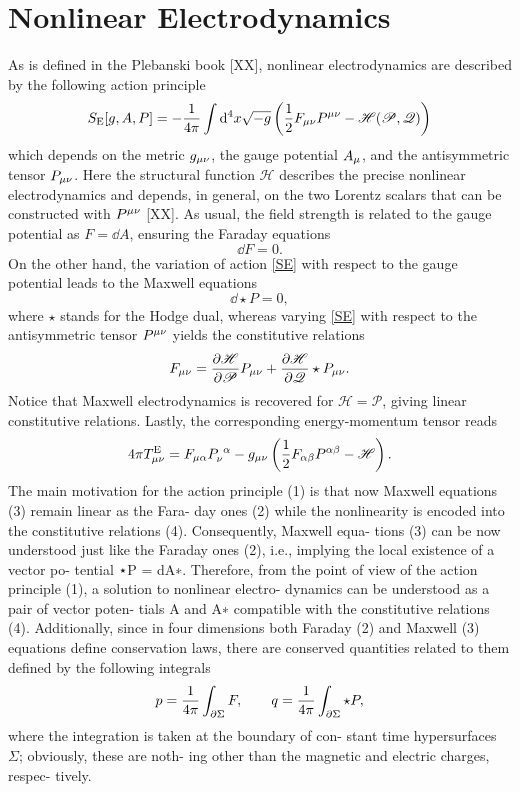 \section{Nonlinear Electrodynamics}
As is defined in the Plebanski book [XX], nonlinear electrodynamics are described by the following action principle
\begin{equation}\label{SE}
  S_{\rm E}[g,A,P]=-\frac{1}{4\pi }\int\dd^4 x\sqrt{-g}\left(\frac{1}{2}F_{\mu\nu }P^{\mu\nu }-\mathscr{H}(\mathscr{P},\mathscr{Q})\right)
\end{equation}
which depends on the metric $g_{\mu\nu }$, the gauge potential $A_\mu$, and the antisymmetric tensor $P_{\mu\nu }$. Here the structural function $\mathscr{H}$ describes the precise nonlinear electrodynamics and depends, in general, on the two Lorentz scalars that can be constructed with $P^{\mu\nu }$ [XX]. As usual, the field strength is related to the gauge potential as $F=\dd A$, ensuring the Faraday equations
\begin{equation}
  \dd F=0.
\end{equation}
On the other hand, the variation of action \eqref{SE} with respect to the gauge potential leads to the Maxwell equations
\begin{equation}
	\dd \star P=0,
\end{equation}
where $\star$ stands for the Hodge dual, whereas varying \eqref{SE} with respect to the antisymmetric tensor $P^{\mu\nu }$ yields the constitutive relations
\begin{equation}
  F_{\mu\nu }=\pdv{\mathscr{H}}{\mathscr{P}}P_{\mu\nu }+\pdv{\mathscr{H}}{\mathscr{Q}}\star P_{\mu\nu }.
\end{equation}
Notice that Maxwell electrodynamics is recovered for $\mathscr{H}=\mathscr{P}$, giving linear constitutive relations. Lastly, the corresponding energy-momentum tensor reads
\begin{equation}
  4\pi T_{\mu\nu }^{\rm E}=F_{\mu\alpha }P_{\nu }^{~\alpha }-g_{\mu\nu }\left(\frac{1}{2}F_{\alpha\beta }P^{\alpha\beta }-\mathscr{H}\right). 
\end{equation}
The main motivation for the action principle (1) is that now Maxwell equations (3) remain linear as the Fara- day ones (2) while the nonlinearity is encoded into the constitutive relations (4). Consequently, Maxwell equa- tions (3) can be now understood just like the Faraday ones (2), i.e., implying the local existence of a vector po- tential ⋆P = dA∗. Therefore, from the point of view of the action principle (1), a solution to nonlinear electro- dynamics can be understood as a pair of vector poten- tials A and A∗ compatible with the constitutive relations (4). Additionally, since in four dimensions both Faraday (2) and Maxwell (3) equations define conservation laws, there are conserved quantities related to them defined by the following integrals
\begin{equation}
  p=\frac{1}{4\pi }\int_{\partial\Sigma}F,\qquad q=\frac{1}{4\pi }\int_{\partial\Sigma}\star P, 
\end{equation}
where the integration is taken at the boundary of con-
stant time hypersurfaces $\Sigma $; obviously, these are noth- ing other than the magnetic and electric charges, respec- tively.

